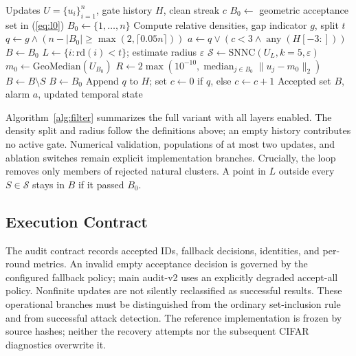 \documentclass[journal]{IEEEtran}
\newcommand{\rd}{\mathrm{rd}}
\begin{document}
\begin{algorithm}[!t]
\caption{Full-filter decision for a validated round ($n\geq3$)}\label{alg:filter}
\begin{algorithmic}[1]
\REQUIRE Updates $U=\{u_i\}_{i=1}^n$, gate history $H$, clean streak $c$
\STATE $B_0\gets$ geometric acceptance set in (\ref{eq:l0})
 \STATE $B_0\gets\{1,\ldots,n\}$ \ENDIF
\STATE Compute relative densities, gap indicator $g$, split $t$
\STATE $q\gets g\land(n-|B_0|\geq\max(2,\lceil0.05n\rceil))$
\STATE $a\gets q\lor(c<3\land\operatorname{any}(H[-3:]))$
\STATE $B\gets B_0$
  \STATE $L\gets\{i:\rd(i)<t\}$; estimate radius $\varepsilon$
  \STATE $\mathcal{S}\gets\mathrm{SNNC}(U_L,k=5,\varepsilon)$
  \STATE $m_0\gets\mathrm{GeoMedian}(U_{B_0})$
  \STATE $R\gets2\max(10^{-10},\operatorname{median}_{j\in B_0}\|u_j-m_0\|_2)$
      \STATE $B\gets B\setminus S$
    \ENDIF
  \ENDFOR
   \STATE $B\gets B_0$ \ENDIF
\ENDIF
\STATE Append $q$ to $H$; set $c\gets0$ if $q$, else $c\gets c+1$
\ENSURE Accepted set $B$, alarm $a$, updated temporal state
\end{algorithmic}
\end{algorithm}

Algorithm~\ref{alg:filter} summarizes the full variant with all layers enabled. The density split and radius follow the definitions above; an empty history contributes no active gate. Numerical validation, populations of at most two updates, and ablation switches remain explicit implementation branches. Crucially, the loop removes only members of rejected natural clusters. A point in $L$ outside every $S\in\mathcal{S}$ stays in $B$ if it passed $B_0$.

\subsection{Execution Contract}
The audit contract records accepted IDs, fallback decisions, identities, and per-round metrics. An invalid empty acceptance decision is governed by the configured fallback policy; main audit-v2 uses an explicitly degraded accept-all policy. Nonfinite updates are not silently reclassified as successful results. These operational branches must be distinguished from the ordinary set-inclusion rule and from successful attack detection. The reference implementation is frozen by source hashes; neither the recovery attempts nor the subsequent CIFAR diagnostics overwrite it.
\end{document}
